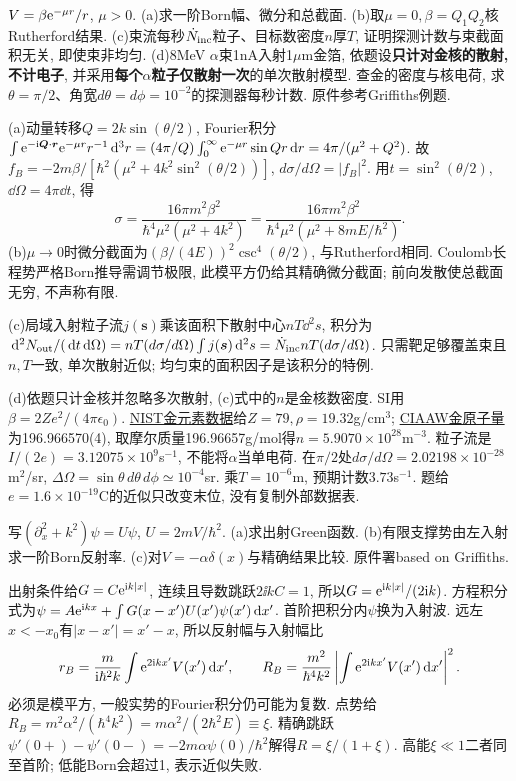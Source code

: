 \begin{exercise}
$V=\beta\mathrm e^{-\mu r}/r$, $\mu>0$. (a)求一阶Born幅、微分和总截面. (b)取$\mu=0,\beta=Q_1Q_2$核Rutherford结果. (c)束流每秒$\dot N_{\rm inc}$粒子、目标数密度$n$厚$T$, 证明探测计数与束截面积无关, 即使束非均匀. (d)8MeV $\alpha$束1nA入射1$\mu$m金箔, 依题设\textbf{只计对金核的散射, 不计电子}, 并采用\textbf{每个$\alpha$粒子仅散射一次}的单次散射模型. 查金的密度与核电荷, 求$\theta=\pi/2$、角宽$d\theta=d\phi=10^{-2}$的探测器每秒计数. 原件参考Griffiths例题.
\end{exercise}
\begin{solution}
(a)动量转移$Q=2k\sin(\theta/2)$, Fourier积分
$\int\mathrm e^{-\mathrm i\boldsymbol Q\cdot\boldsymbol r}\mathrm e^{-\mu r}r^{-1}\,\mathrm d^3r
=(4\pi/Q)\int_0^\infty\mathrm e^{-\mu r}\sin Qr\,\mathrm d r=4\pi/(\mu^2+Q^2)$.
故$f_B=-2m\beta/[\hbar^2(\mu^2+4k^2\sin^2(\theta/2))]$, $d\sigma/d\Omega=|f_B|^2$. 用$t=\sin^2(\theta/2)$, $\dd\Omega=4\pi\dd t$, 得
\[
\sigma=\frac{16\pi m^2\beta^2}{\hbar^4\mu^2(\mu^2+4k^2)}
=\frac{16\pi m^2\beta^2}{\hbar^4\mu^2(\mu^2+8mE/\hbar^2)}.
\]
(b)$\mu\to0$时微分截面为$(\beta/(4E))^2\csc^4(\theta/2)$, 与Rutherford相同. Coulomb长程势严格Born推导需调节极限, 此模平方仍给其精确微分截面; 前向发散使总截面无穷, 不声称有限.

(c)局域入射粒子流$j(\boldsymbol s)$乘该面积下散射中心$nT\dd^2s$, 积分为
$\,\mathrm d^2N_{\rm out}/(\,\mathrm d t\,\mathrm d\Omega)=nT(d\sigma/d\Omega)\int j(\boldsymbol s)\,\mathrm d^2s
=\dot N_{\rm inc}nT(d\sigma/d\Omega)$. 只需靶足够覆盖束且$n,T$一致, 单次散射近似; 均匀束的面积因子是该积分的特例.

(d)依题只计金核并忽略多次散射, (c)式中的$n$是金核数密度. SI用$\beta=2Ze^2/(4\pi\epsilon_0)$. \href{https://physics.nist.gov/cgi-bin/Star/compos.pl?matno=079}{NIST金元素数据}给$Z=79,\rho=19.32$g/cm$^3$; \href{https://ciaaw.org/gold.htm}{CIAAW金原子量}为196.966570(4), 取摩尔质量196.96657g/mol得$n=5.9070\times10^{28}$m$^{-3}$. 粒子流是$I/(2e)=3.12075\times10^9$s$^{-1}$, 不能将$\alpha$当单电荷. 在$\pi/2$处$d\sigma/d\Omega=2.02198\times10^{-28}$m$^2$/sr, $\Delta\Omega=\sin\theta\,d\theta\,d\phi\simeq10^{-4}$sr. 乘$T=10^{-6}$m, 预期计数$3.73$s$^{-1}$. 题给$e=1.6\times10^{-19}$C的近似只改变末位, 没有复制外部数据表.
\end{solution}
\begin{exercise}
写$(\partial_x^2+k^2)\psi=U\psi$, $U=2mV/\hbar^2$. (a)求出射Green函数. (b)有限支撑势由左入射求一阶Born反射率. (c)对$V=-\alpha\delta(x)$与精确结果比较. 原件署based on Griffiths.
\end{exercise}
\begin{solution}
出射条件给$G=C\mathrm e^{\mathrm i k|x|}$, 连续且导数跳跃$2\ii kC=1$, 所以$G=\mathrm e^{\mathrm i k|x|}/(2\mathrm i k)$. 方程积分式为$\psi=A\mathrm e^{\mathrm i kx}+\int G(x-x')U(x')\psi(x')\,\mathrm d x'$. 首阶把积分内$\psi$换为入射波. 远左$x<-x_0$有$|x-x'|=x'-x$, 所以反射幅与入射幅比
\[
r_B=\frac{m}{\mathrm i\hbar^2k}\int\mathrm e^{2\mathrm i kx'}V(x')\,\mathrm d x',
\qquad R_B=\frac{m^2}{\hbar^4k^2}\left|\int\mathrm e^{2\mathrm i kx'}V(x')\,\mathrm d x'\right|^2.
\]
必须是模平方, 一般实势的Fourier积分仍可能为复数. 点势给$R_B=m^2\alpha^2/(\hbar^4k^2)=m\alpha^2/(2\hbar^2E)\equiv\xi$. 精确跳跃$\psi'(0+)-\psi'(0-)=-2m\alpha\psi(0)/\hbar^2$解得$R=\xi/(1+\xi)$. 高能$\xi\ll1$二者同至首阶; 低能Born会超过1, 表示近似失败.
\end{solution}
